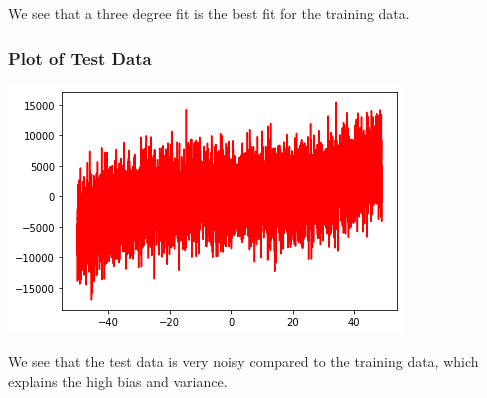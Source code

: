 \documentclass{article}
\begin{document}
We see that a three degree fit is the best fit for the training data.


\subsubsection{Plot of Test Data}
\includegraphics[scale=.9]{images/test-2.png}

We see that the test data is very noisy compared to the training data, which explains the high bias and variance.
\end{document}
